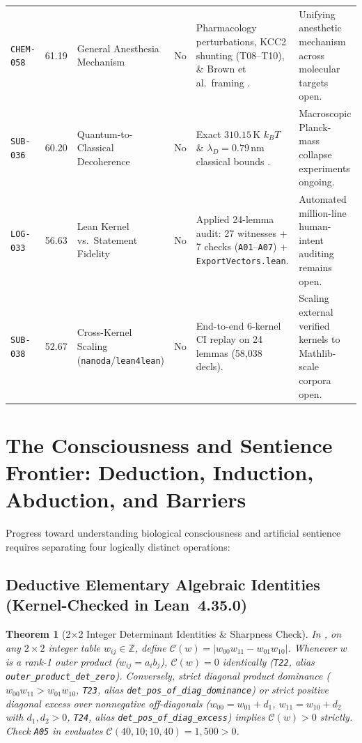 \documentclass[11pt,letterpaper]{amsart}
\newtheorem{theorem}{Theorem}[section]
\begin{document}
\begin{table}[htbp]
\begin{tabularx}{\textwidth}{@{}>{\raggedright\arraybackslash}p{1.7cm}r>{\raggedright\arraybackslash}p{3.35cm}l>{\raggedright\arraybackslash}p{4.15cm}L@{}}
\texttt{CHEM-058} & 61.19 & General Anesthesia Mechanism & No & Pharmacology perturbations, KCC2 shunting (T08--T10), \& Brown et al.\ framing \cite{brown2010anesthesia}. & Unifying anesthetic mechanism across molecular targets open. \\
\texttt{SUB-036} & 60.20 & Quantum-to-Classical Decoherence & No & Exact $310.15\,$K $k_B T$ \& $\lambda_D = 0.79\,$nm classical bounds \cite{tegmark2000decoherence}. & Macroscopic Planck-mass collapse experiments ongoing. \\
\texttt{LOG-033} & 56.63 & Lean Kernel vs.\ Statement Fidelity & No & Applied 24-lemma audit: 27 witnesses + 7 checks (\texttt{A01}--\texttt{A07}) + \texttt{ExportVectors.lean}. & Automated million-line human-intent auditing remains open. \\
\texttt{SUB-038} & 52.67 & Cross-Kernel Scaling (\texttt{nanoda}/\texttt{lean4lean}) & No & End-to-end 6-kernel CI replay on 24 lemmas (58,038 decls). & Scaling external verified kernels to Mathlib-scale corpora open. \\
\bottomrule
\end{tabularx}
\end{table}

\section{The Consciousness and Sentience Frontier: Deduction, Induction, Abduction, and Barriers}

Progress toward understanding biological consciousness and artificial sentience requires separating four logically distinct operations:

\subsection{Deductive Elementary Algebraic Identities (Kernel-Checked in Lean~4.35.0)}
\begin{theorem}[2$\times$2 Integer Determinant Identities \& Sharpness Check]
In , on any $2\times 2$ integer table $w_{ij} \in \mathbb{Z}$, define $\mathcal{C}(w) = |w_{00} w_{11} - w_{01} w_{10}|$. Whenever $w$ is a rank-1 outer product ($w_{ij} = a_i b_j$), $\mathcal{C}(w) = 0$ identically (\texttt{T22}, alias \texttt{outer\_product\_det\_zero}). Conversely, strict diagonal product dominance ($w_{00} w_{11} > w_{01} w_{10}$, \texttt{T23}, alias \texttt{det\_pos\_of\_diag\_dominance}) or strict positive diagonal excess over nonnegative off-diagonals ($w_{00} = w_{01} + d_1$, $w_{11} = w_{10} + d_2$ with $d_1, d_2 > 0$, \texttt{T24}, alias \texttt{det\_pos\_of\_diag\_excess}) implies $\mathcal{C}(w) > 0$ strictly. Check \texttt{A05} in  evaluates $\mathcal{C}(40,10;10,40) = 1{,}500 > 0$.
\end{theorem}
\end{document}
